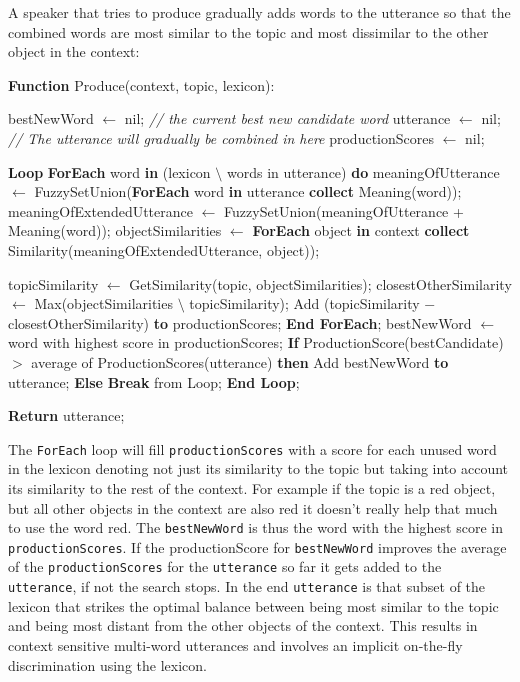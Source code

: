  A speaker that tries to produce gradually
adds words to the utterance so that the combined words are most
similar to the topic and most dissimilar to the other object in the
context:

\begin{verbatim+}
\textbf{Function} Produce(context, topic, lexicon):

bestNewWord $\leftarrow$ nil; \textit{// the current best new candidate word} 
utterance $\leftarrow$ nil; \textit{// The utterance will gradually be combined in here} 
productionScores $\leftarrow$ nil;

\textbf{Loop}
    \textbf{ForEach} word \textbf{in} (lexicon $\setminus$ words in utterance) \textbf{do}
        meaningOfUtterance $\leftarrow$ FuzzySetUnion(\textbf{ForEach} word \textbf{in} utterance
                                            \textbf{collect} Meaning(word));
        meaningOfExtendedUtterance $\leftarrow$ FuzzySetUnion(meaningOfUtterance 
                                                    + Meaning(word));
        objectSimilarities 
            $\leftarrow$ \textbf{ForEach} object \textbf{in} context 
                  \textbf{collect} Similarity(meaningOfExtendedUtterance, 
                                     object));

        topicSimilarity 
            $\leftarrow$ GetSimilarity(topic, objectSimilarities);
        closestOtherSimilarity 
            $\leftarrow$ Max(objectSimilarities $\setminus$ topicSimilarity);
        Add (topicSimilarity $-$ closestOtherSimilarity) 
            \textbf{to} productionScores;
    \textbf{End ForEach};
    bestNewWord $\leftarrow$ word with highest score in productionScores;
    \textbf{If} ProductionScore(bestCandidate) 
        $>$ average of ProductionScores(utterance)
        \textbf{then} Add bestNewWord \textbf{to} utterance;
        \textbf{Else} \textbf{Break} from Loop;
\textbf{End Loop};

\textbf{Return} utterance;
\end{verbatim+}

\noindent The \texttt{ForEach} loop will fill
\texttt{productionScores} with a score for each unused word in the
lexicon denoting not just its similarity to the topic but taking into
account its similarity to the rest of the context. For example if the
topic is a red object, but all other objects in the context are also
red it doesn't really help that much to use the word red. The
\texttt{bestNewWord} is thus the word with the highest score in
\texttt{productionScores}. If the productionScore for
\texttt{bestNewWord} improves the average of the
\texttt{productionScores} for the \verb+utterance+ so far it gets
added to the \texttt{utterance}, if not the search stops. In the end
\texttt{utterance} is that subset of the lexicon that strikes the
optimal balance between being most similar to the topic and being most
distant from the other objects of the context. This results in context
sensitive multi-word utterances and involves an implicit on-the-fly
discrimination using the lexicon.


